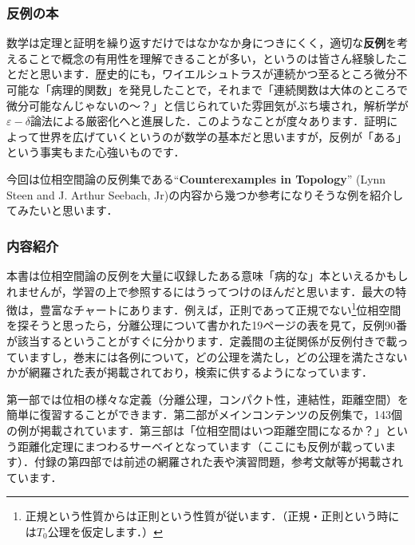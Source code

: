 \subsubsection*{反例の本}
数学は定理と証明を繰り返すだけではなかなか身につきにくく，適切な{\bf 反例}を考えることで概念の有用性を理解できることが多い，というのは皆さん経験したことだと思います．歴史的にも，ワイエルシュトラスが連続かつ至るところ微分不可能な「病理的関数」を発見したことで，それまで「連続関数は大体のところで微分可能なんじゃないの〜？」と信じられていた雰囲気がぶち壊され，解析学が$\varepsilon - \delta$論法による厳密化へと進展した．このようなことが度々あります．証明によって世界を広げていくというのが数学の基本だと思いますが，反例が「ある」という事実もまた心強いものです．\par
今回は位相空間論の反例集である``\textbf{Counterexamples in Topology}''  (Lynn Steen and J. Arthur Seebach, Jr)の内容から幾つか参考になりそうな例を紹介してみたいと思います．
\subsubsection*{内容紹介}
本書は位相空間論の反例を大量に収録したある意味「病的な」本といえるかもしれませんが，学習の上で参照するにはうってつけのほんだと思います．最大の特徴は，豊富なチャートにあります．例えば，正則であって正規でない\footnote{正規という性質からは正則という性質が従います．（正規・正則という時には$T_0$公理を仮定します．）}位相空間を探そうと思ったら，分離公理について書かれた19ページの表を見て，反例90番が該当するということがすぐに分かります．定義間の主従関係が反例付きで載っていますし，巻末には各例について，どの公理を満たし，どの公理を満たさないかが網羅された表が掲載されており，検索に供するようになっています．\par
第一部では位相の様々な定義（分離公理，コンパクト性，連結性，距離空間）を簡単に復習することができます．第二部がメインコンテンツの反例集で，143個の例が掲載されています．第三部は「位相空間はいつ距離空間になるか？」という距離化定理にまつわるサーベイとなっています（ここにも反例が載っています）．付録の第四部では前述の網羅された表や演習問題，参考文献等が掲載されています．

